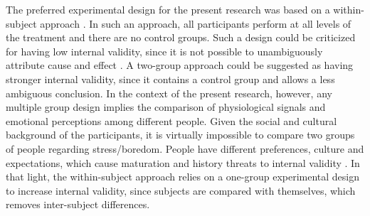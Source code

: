The preferred experimental design for the present research was based on a within-subject approach \parencite{lane2015online}. In such an approach, all participants perform at all levels of the treatment and there are no control groups.
Such a design could be criticized for having low internal validity, since it is not possible to unambiguously attribute cause and effect \parencite{kirk1982experimental}. A two-group approach could be suggested as having stronger internal validity, since it contains a control group and allows a less ambiguous conclusion. In the context of the present research, however, any multiple group design implies the comparison of physiological signals and emotional perceptions among different people. Given the social and cultural background of the participants, it is virtually impossible to compare two groups of people regarding stress/boredom. People have different preferences, culture and expectations, which cause maturation and history threats to internal validity \parencite{trochim2001research}.
In that light, the within-subject approach relies on a one-group experimental design to increase internal validity, since subjects are compared with themselves, which removes inter-subject differences.

